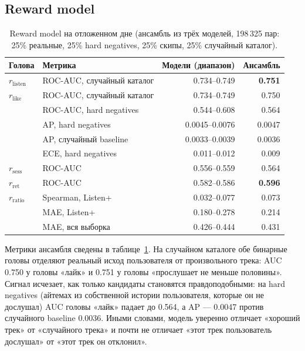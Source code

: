 \subsection{Reward model}

\begin{table}[t]
\centering
\caption{Reward model на отложенном дне (ансамбль из трёх моделей, 198\,325
пар: 25\% реальные, 25\% hard negatives, 25\% скипы, 25\% случайный
каталог).}
\label{tab:rm}
\small
\begin{tabular}{@{}llrr@{}}
\toprule
Голова & Метрика & Модели (диапазон) & Ансамбль \\
\midrule
$r_{\text{listen}}$ & ROC-AUC, случайный каталог & 0.734--0.749 & \textbf{0.751} \\
$r_{\text{like}}$   & ROC-AUC, случайный каталог & 0.734--0.749 & 0.750 \\
                    & ROC-AUC, hard negatives     & 0.544--0.608 & 0.564 \\
                    & AP, hard negatives          & 0.0045--0.0076 & 0.0047 \\
                    & AP, случайный baseline      & 0.0033--0.0039 & 0.0036 \\
                    & ECE, hard negatives         & 0.011--0.012 & 0.009 \\
$r_{\text{sess}}$   & ROC-AUC & 0.556--0.559 & 0.564 \\
$r_{\text{ret}}$    & ROC-AUC & 0.582--0.586 & \textbf{0.596} \\
$r_{\text{ratio}}$  & Spearman, Listen+ & 0.032--0.077 & 0.073 \\
                    & MAE, Listen+ & 0.180--0.278 & 0.214 \\
                    & MAE, вся выборка & 0.426--0.444 & 0.431 \\
\bottomrule
\end{tabular}
\end{table}

Метрики ансамбля сведены в таблице~\ref{tab:rm}. На случайном каталоге
обе бинарные головы отделяют реальный исход пользователя от произвольного
трека: AUC 0.750 у головы «лайк» и 0.751 у головы «прослушает не меньше
половины». Сигнал исчезает, как только кандидаты становятся
правдоподобными: на hard negatives (айтемах из собственной истории
пользователя, которые он не дослушал) AUC головы «лайк» падает до 0.564,
а AP --- 0.0047 против случайного baseline 0.0036. Иными словами, модель
уверенно отличает «хороший трек» от «случайного трека» и почти не отличает
«этот трек пользователь дослушал» от «этот трек он отклонил».

